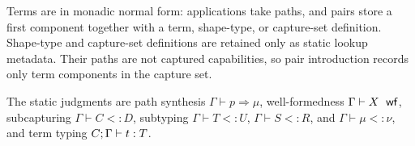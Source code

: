 \documentclass[acmsmall,screen,nonacm]{acmart}
\begin{document}
Terms are in monadic normal form: applications take paths, and pairs store a
first component together with a term, shape-type, or capture-set definition.
Shape-type and capture-set definitions are retained only as static lookup
metadata. Their paths are not captured capabilities, so pair introduction
records only term components in the capture set.

The static judgments are path synthesis \(\Gamma\vdash p\Rightarrow\mu\),
well-formedness \(\Gamma\vdash X\ \mathrel{\mathsf{wf}}\), subcapturing
\(\Gamma\vdash C<:D\), subtyping \(\Gamma\vdash T<:U\),
\(\Gamma\vdash S<:R\), and \(\Gamma\vdash\mu<:\nu\), and term typing
\({C}; {\Gamma}\vdash {t} : {T}\).

\clearpage
\begingroup
\setlength{\abovedisplayskip}{5pt plus 1pt minus 1pt}
\setlength{\belowdisplayskip}{5pt plus 1pt minus 1pt}
\setlength{\intextsep}{5pt}
\captionsetup{skip=6pt}
\setlength{\afterruleskip}{0.65em plus 0.1em minus 0.05em}
\renewcommand{\plateheader}[2]{%
  \par\addvspace{0.45em}%
  \noindent\textbf{#1}%
  \if\relax\detokenize{#2}\relax\else
    \hfill{\setlength{\fboxsep}{3pt}\setlength{\fboxrule}{0.5pt}%
      \fbox{\(\strut #2\)}}%
  \fi\par
  \nobreak\addvspace{0.45em}%
}
\end{document}
